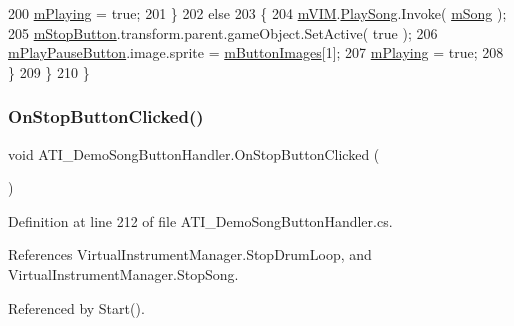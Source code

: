 \begin{DoxyCode}
200                 \hyperlink{class_a_t_i___demo_song_button_handler_aefbba0db111a0d4ba1b1d9f5c1cae41d}{mPlaying} = \textcolor{keyword}{true};
201             \}
202             \textcolor{keywordflow}{else}
203             \{
204                 \hyperlink{class_a_t_i___demo_song_button_handler_ac078f283ce74a7b310ebb2cbbc55f70b}{mVIM}.\hyperlink{group___v_i_m_events_gae450bdba9c513ab4e43f69def50fa84d}{PlaySong}.Invoke( \hyperlink{class_a_t_i___demo_song_button_handler_aef782d481c6250a9062162c71298ed8f}{mSong} );
205                 \hyperlink{class_a_t_i___demo_song_button_handler_ad6a342b9b2333c8c613b968a0ca7545c}{mStopButton}.transform.parent.gameObject.SetActive( \textcolor{keyword}{true} );
206                 \hyperlink{class_a_t_i___demo_song_button_handler_a9f3be8593e24316510ca461f105061fd}{mPlayPauseButton}.image.sprite = \hyperlink{class_a_t_i___demo_song_button_handler_a9d62cca93ee54ba52e0c7de5f30d9490}{mButtonImages}[1];
207                 \hyperlink{class_a_t_i___demo_song_button_handler_aefbba0db111a0d4ba1b1d9f5c1cae41d}{mPlaying} = \textcolor{keyword}{true};
208             \}
209         \}
210     \}
\end{DoxyCode}
\mbox{\label{class_a_t_i___demo_song_button_handler_a74b93fb6f260529a0f7260238226677b}} 
\subsubsection{\texorpdfstring{On\+Stop\+Button\+Clicked()}{OnStopButtonClicked()}}
{\footnotesize\ttfamily void A\+T\+I\+\_\+\+Demo\+Song\+Button\+Handler.\+On\+Stop\+Button\+Clicked (\begin{DoxyParamCaption}{ }\end{DoxyParamCaption})}



Definition at line 212 of file A\+T\+I\+\_\+\+Demo\+Song\+Button\+Handler.\+cs.



References Virtual\+Instrument\+Manager.\+Stop\+Drum\+Loop, and Virtual\+Instrument\+Manager.\+Stop\+Song.



Referenced by Start().


